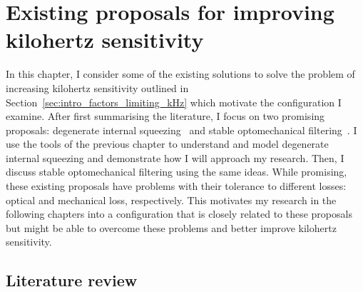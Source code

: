 \chapter{Existing proposals for improving kilohertz sensitivity} %
\label{chp:proposals}

In this chapter, I consider some of the existing solutions to solve the problem of increasing kilohertz sensitivity outlined in Section~\ref{sec:intro_factors_limiting_kHz} which motivate the configuration I examine. After first summarising the literature, I focus on two promising proposals: degenerate internal squeezing~\cite{} and stable optomechanical filtering~\cite{}. I use the tools of the previous chapter to understand and model degenerate internal squeezing and demonstrate how I will approach my research. Then, I discuss stable optomechanical filtering using the same ideas. %
While promising, these existing proposals have problems with their tolerance to different losses: optical and mechanical loss, respectively. This motivates my research in the following chapters into a configuration that is closely related to these proposals but might be able to overcome these problems and better improve kilohertz sensitivity.


\section{Literature review}
\label{sec:literature_review}


